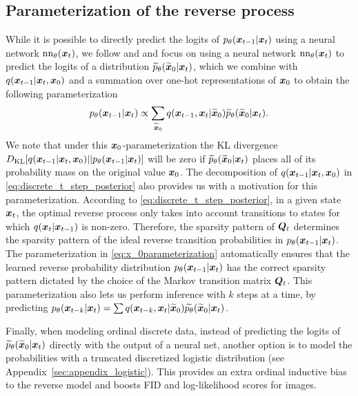 \subsection{Parameterization of the reverse process}
\label{sec:x0_parameterization}
While it is possible to directly predict the logits of $p_{\theta}(\boldsymbol{x}_{t-1}|\boldsymbol{x}_{t})$ using a neural network $\mathrm{nn}_{\theta}(\boldsymbol{x}_t)$, we follow \citet{ho2020denoising} and \citet{hoogeboom2021argmax} and focus on using a neural network 
$\mathrm{nn}_{\theta}(\boldsymbol{x}_t)$ to predict the logits of a distribution $\widetilde{p}_{\theta}(\widetilde{\boldsymbol{x}}_0|\boldsymbol{x}_t)$, which we combine with $q(\boldsymbol{x}_{t-1}|\boldsymbol{x}_t, \boldsymbol{x}_0)$ and a summation over one-hot representations of $\boldsymbol{x}_0$ to obtain the following parameterization
\begin{align}
    p_{\theta}(\boldsymbol{x}_{t-1}|\boldsymbol{x}_t) \propto \sum_{\widetilde{\boldsymbol{x}}_0} q(\boldsymbol{x}_{t-1}, \boldsymbol{x}_t \vert \widetilde{\boldsymbol{x}}_0) \widetilde{p}_{\theta}(\widetilde{\boldsymbol{x}}_0|\boldsymbol{x}_t).
    \label{eq:x_0parameterization}
\end{align}
We note that under this $\boldsymbol{x}_0$-parameterization the KL divergence $D_{\mathrm{KL}}[q(\boldsymbol{x}_{t-1} | \boldsymbol{x}_t, \boldsymbol{x}_0) \vert\vert p_{\theta}(\boldsymbol{x}_{t-1}|\boldsymbol{x}_t)]$ will be zero if $\widetilde{p}_{\theta}(\widetilde{\boldsymbol{x}}_0|\boldsymbol{x}_t)$ places all of its probability mass on the original value $\boldsymbol{x}_0$.
The decomposition of $q(\boldsymbol{x}_{t-1}|\boldsymbol{x}_{t}, \boldsymbol{x}_0)$ in \eqref{eq:discrete_t_step_posterior} also provides us with a motivation for this parameterization. According to  \eqref{eq:discrete_t_step_posterior},  in a given state $\boldsymbol{x}_t$, the optimal reverse process only takes into account transitions to states for which $q(\boldsymbol{x}_t | \boldsymbol{x}_{t-1})$ is non-zero. Therefore, the sparsity pattern of $\boldsymbol{Q}_t$ determines the sparsity pattern of the ideal reverse transition probabilities in $p_{\theta}(\boldsymbol{x}_{t-1}| \boldsymbol{x}_{t})$. The parameterization in \eqref{eq:x_0parameterization} automatically ensures that the learned reverse probability distribution $p_{\theta}(\boldsymbol{x}_{t-1}|\boldsymbol{x}_{t})$ has the correct sparsity pattern dictated by the choice of the Markov transition matrix $\boldsymbol{Q}_t$. This parameterization also lets us perform inference with $k$ steps at a time, by predicting $p_\theta(\boldsymbol{x}_{t-k} | \boldsymbol{x}_t) = \sum q(\boldsymbol{x}_{t-k}, \boldsymbol{x}_t |  \widetilde{\boldsymbol{x}}_0)\widetilde{p_\theta}(\widetilde{\boldsymbol{x}}_0 | \boldsymbol{x}_t)$.

Finally, when modeling ordinal discrete data, instead of predicting the logits of $\widetilde p_{\theta}(\widetilde{\boldsymbol{x}}_0|\boldsymbol{x}_t)$ directly with the output of a neural net, another option is to model the probabilities with a truncated discretized logistic distribution (see Appendix~\ref{sec:appendix_logistic}). This provides an extra ordinal inductive bias to the reverse model and boosts FID and log-likelihood scores for images.

